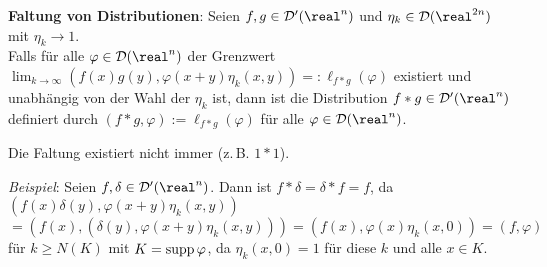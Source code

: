 \textbf{Faltung von Distributionen}:
Seien $f, g \in \D'(\real^n)$ und $\eta_k \in \D(\real^{2n})$ mit
$\eta_k \to 1$.\\
Falls für alle $\varphi \in \D(\real^n)$ der Grenzwert
$\lim_{k \to \infty} (f(x)g(y), \varphi(x + y)\eta_k(x, y)) =:
\ell_{f \ast g}(\varphi)$ existiert und unabhängig von der Wahl der $\eta_k$
ist, dann ist die Distribution $f \ast g \in \D'(\real^n)$ definiert durch
$(f \ast g, \varphi) := \ell_{f \ast g}(\varphi)$ für alle
$\varphi \in \D(\real^n)$.

Die Faltung existiert nicht immer (z.\,B. $1 \ast 1$).

\emph{Beispiel}:
Seien $f, \delta \in \D'(\real^n)$.
Dann ist $f \ast \delta = \delta \ast f = f$, da
$(f(x)\delta(y), \varphi(x + y)\eta_k(x, y))$\\
$= (f(x), (\delta(y), \varphi(x + y)\eta_k(x, y))) =
(f(x), \varphi(x)\eta_k(x, 0)) =
(f, \varphi)$ für $k \ge N(K)$ mit $K = \operatorname{supp} \varphi$,
da $\eta_k(x, 0) = 1$ für diese $k$ und alle $x \in K$.

\linie
\pagebreak

